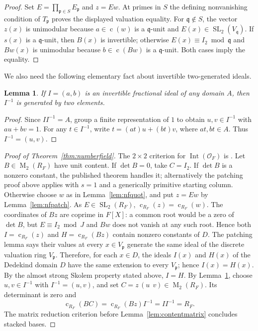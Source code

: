 \documentclass[11pt]{amsart}
\newtheorem{lemma}[theorem]{Lemma}
\theoremstyle{definition}
\theoremstyle{remark}
\newcommand{\Int}{\operatorname{Int}}
\newcommand{\cont}{\operatorname{c}}
\newcommand{\Mat}{\operatorname{M}}
\newcommand{\SL}{\operatorname{SL}}
\begin{document}
\begin{proof}
Set $E=\prod_{\mathfrak p\in S}E_{\mathfrak p}$ and $z=Ew$.
At primes in $S$ the defining nonvanishing condition of
$T_{\mathfrak p}$ proves the displayed valuation equality.
For $\mathfrak q\notin S$, the vector $z(x)$ is unimodular
because $a\in\cont(w)$ is a $\mathfrak q$-unit and
$E(x)\in\SL_2(V_{\mathfrak q})$.
If $s(x)$ is a $\mathfrak q$-unit, then $B(x)$ is invertible;
otherwise $E(x)\equiv I_2\bmod\mathfrak q$ and
$Bw(x)$ is unimodular because $b\in\cont(Bw)$ is a
$\mathfrak q$-unit.  Both cases imply the equality.
\end{proof}


We also need the following elementary fact about invertible two-generated ideals.
\begin{lemma}
\label{lem:inverse2}
If $I=(a,b)$ is an invertible fractional ideal of any domain $A$, then
$I^{-1}$ is generated by two elements.
\end{lemma}
\begin{proof}
Since $II^{-1}=A$, group a finite representation of $1$ to
obtain $u,v\in I^{-1}$ with $au+bv=1$.
For any $t\in I^{-1}$, write
$t=(at)u+(bt)v$, where $at,bt\in A$.
Thus $I^{-1}=(u,v)$.
\end{proof}

\begin{proof}[Proof of Theorem~\ref{thm:numberfield}]
The $2\times2$ criterion for $\Int(\mathcal O_F)$ is
\cite[Theorem IX.25]{Chabert2025}.
Let $B\in\Mat_2(R_F)$ have unit content.
If $\det B=0$, take $C=I_2$.  If $\det B$ is a nonzero
constant, the published theorem handles it; alternatively the
patching proof above applies with $s=1$ and a generically
primitive starting column.
Otherwise choose $w$ as in Lemma~\ref{lem:nfquot}, and put
$z=Ew$ by Lemma~\ref{lem:nfpatch}.
As $E\in\SL_2(R_F)$,
$\cont_{R_F}(z)=\cont_{R_F}(w)$.  The coordinates of $Bz$
are coprime in $F[X]$: a common root would be a zero of
$\det B$, but $E\equiv I_2\bmod J$ and
$Bw$ does not vanish at any such root. Hence both
$I=\cont_{R_F}(z)$ and $H=\cont_{R_F}(Bz)$ contain nonzero
constants of $D$.  The patching lemma says their values
at every $x\in V_{\mathfrak p}$ generate the same ideal of
the discrete valuation ring $V_{\mathfrak p}$.
Therefore, for each $x\in D$, the ideals $I(x)$ and $H(x)$
of the Dedekind domain $D$ have the same extension to every
$V_{\mathfrak p}$; hence $I(x)=H(x)$.
By the almost strong Skolem property stated above, $I=H$.
By Lemma~\ref{lem:inverse2}, choose $u,v\in I^{-1}$ with
$I^{-1}=(u,v)$, and set
$C=z\,(u\ \ v)\in\Mat_2(R_F)$.  Its determinant is zero and
\[
\cont_{R_F}(BC)=\cont_{R_F}(Bz)I^{-1}
=II^{-1}=R_F.
\]
The matrix reduction criterion before Lemma~\ref{lem:contentmatrix} concludes stacked bases.
\end{proof}
\end{document}
